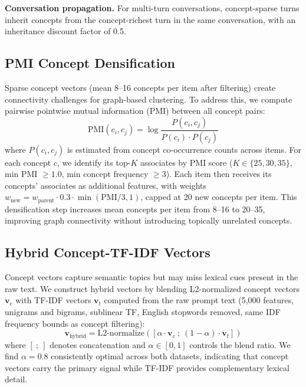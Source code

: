 \documentclass[conference]{IEEEtran}
\begin{document}
\textbf{Conversation propagation.} For multi-turn conversations, concept-sparse turns inherit concepts from the concept-richest turn in the same conversation, with an inheritance discount factor of 0.5.

\subsection{PMI Concept Densification}

Sparse concept vectors (mean 8--16 concepts per item after filtering) create connectivity challenges for graph-based clustering. To address this, we compute pairwise pointwise mutual information (PMI) between all concept pairs:
\begin{equation}
    \text{PMI}(c_i, c_j) = \log \frac{P(c_i, c_j)}{P(c_i) \cdot P(c_j)}
\end{equation}
where $P(c_i, c_j)$ is estimated from concept co-occurrence counts across items. For each concept $c$, we identify its top-$K$ associates by PMI score ($K \in \{25, 30, 35\}$, min PMI $\geq 1.0$, min concept frequency $\geq 3$). Each item then receives its concepts' associates as additional features, with weights $w_{\text{new}} = w_{\text{parent}} \cdot 0.3 \cdot \min(\text{PMI}/3, 1)$, capped at 20 new concepts per item. This densification step increases mean concepts per item from 8--16 to 20--35, improving graph connectivity without introducing topically unrelated concepts.

\subsection{Hybrid Concept-TF-IDF Vectors}

Concept vectors capture semantic topics but may miss lexical cues present in the raw text. We construct hybrid vectors by blending L2-normalized concept vectors $\mathbf{v}_c$ with TF-IDF vectors $\mathbf{v}_t$ computed from the raw prompt text (5,000 features, unigrams and bigrams, sublinear TF, English stopwords removed, same IDF frequency bounds as concept filtering):
\begin{equation}
    \mathbf{v}_{\text{hybrid}} = \text{L2-normalize}\left([\alpha \cdot \mathbf{v}_c ~;~ (1-\alpha) \cdot \mathbf{v}_t]\right)
\end{equation}
where $[~;~]$ denotes concatenation and $\alpha \in [0, 1]$ controls the blend ratio. We find $\alpha = 0.8$ consistently optimal across both datasets, indicating that concept vectors carry the primary signal while TF-IDF provides complementary lexical detail.
\end{document}
